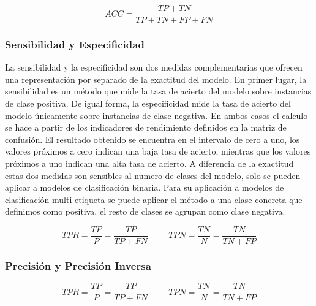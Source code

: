 \bigbreak

\begin{equation}\tag*{}
    ACC = \frac{TP+TN}{TP+TN+FP+FN}
\end{equation}


\subsubsection{Sensibilidad y Especificidad}

La sensibilidad y la especificidad son dos medidas complementarias que ofrecen una representación por separado de la exactitud del modelo. En primer lugar, la sensibilidad es un método que mide la tasa de acierto del modelo sobre instancias de clase positiva. De igual forma, la especificidad mide la tasa de acierto del modelo únicamente sobre instancias de clase negativa. En ambos casos el calculo se hace a partir de los indicadores de rendimiento definidos en la matriz de confusión. El resultado obtenido se encuentra en el intervalo de cero a uno, los valores próximos a cero indican una baja tasa de acierto, mientras que los valores próximos a uno indican una alta tasa de acierto. A diferencia de la exactitud estas dos medidas son sensibles al numero de clases del modelo, solo se pueden aplicar a modelos de clasificación binaria. Para su aplicación a modelos de clasificación multi-etiqueta se puede aplicar el método a una clase concreta que definimos como positiva, el resto de clases se agrupan como clase negativa.

\bigbreak
\begin{equation}\tag*{}
    TPR = \frac{TP}{P} = \frac{TP}{TP+FN}
    \hspace{1cm}
    TPN = \frac{TN}{N} = \frac{TN}{TN+FP}
\end{equation}



\subsubsection{Precisión y Precisión Inversa}

\bigbreak
\begin{equation}\tag*{}
    TPR = \frac{TP}{P} = \frac{TP}{TP+FN}
    \hspace{1cm}
    TPN = \frac{TN}{N} = \frac{TN}{TN+FP}
\end{equation}

